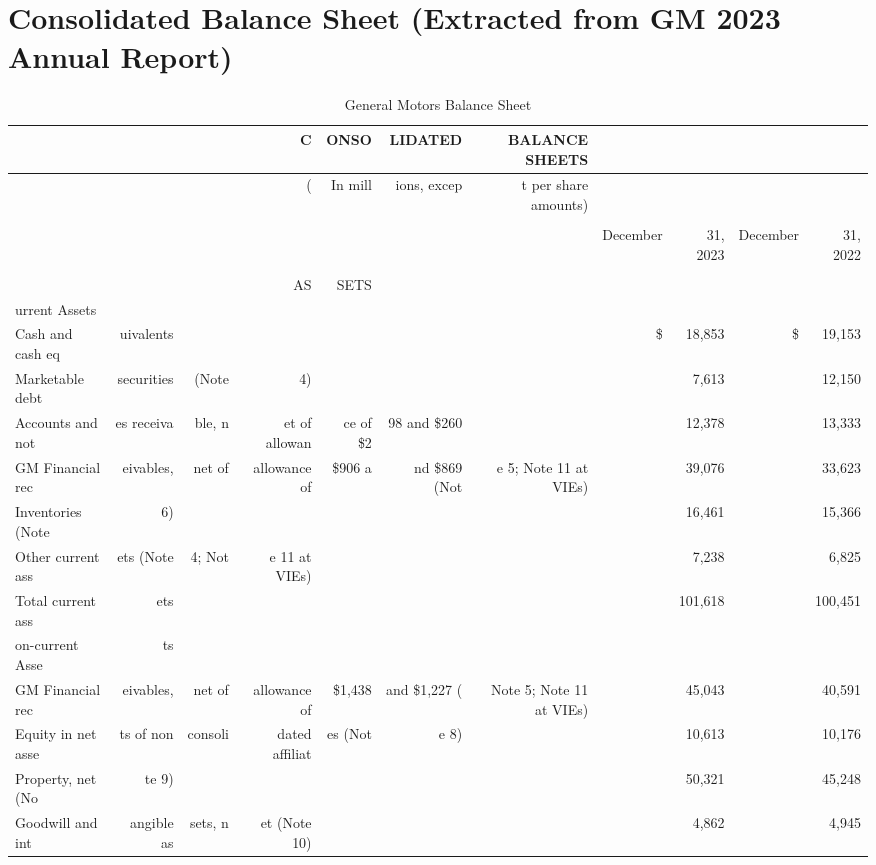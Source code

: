 \documentclass{article}
\begin{document}
\section*{Consolidated Balance Sheet (Extracted from GM 2023 Annual Report)}
\begin{table}[ht]
\centering
\caption{General Motors Balance Sheet}
\begin{tabular}{lrrrrrrrrrr}
\toprule
 &  &  & C & ONSO & LIDATED & BALANCE SHEETS &  &  &  &  \\
\midrule
 &  &  & ( & In mill & ions, excep & t per share amounts) &  &  &  &  \\
 &  &  &  &  &  &  &  &  &  &  \\
 &  &  &  &  &  &  & December & 31, 2023 & December & 31, 2022 \\
 &  &  &  &  &  &  &  &  &  &  \\
 &  &  & AS & SETS &  &  &  &  &  &  \\
urrent Assets &  &  &  &  &  &  &  &  &  &  \\
Cash and cash eq & uivalents &  &  &  &  &  & \$ & 18,853 & \$ & 19,153 \\
Marketable debt & securities & (Note & 4) &  &  &  &  & 7,613 &  & 12,150 \\
Accounts and not & es receiva & ble, n & et of allowan & ce of \$2 & 98 and \$260 &  &  & 12,378 &  & 13,333 \\
GM Financial rec & eivables, & net of & allowance of & \$906 a & nd \$869 (Not & e 5; Note 11 at VIEs) &  & 39,076 &  & 33,623 \\
Inventories (Note & 6) &  &  &  &  &  &  & 16,461 &  & 15,366 \\
Other current ass & ets (Note & 4; Not & e 11 at VIEs) &  &  &  &  & 7,238 &  & 6,825 \\
Total current ass & ets &  &  &  &  &  &  & 101,618 &  & 100,451 \\
on-current Asse & ts &  &  &  &  &  &  &  &  &  \\
GM Financial rec & eivables, & net of & allowance of & \$1,438 & and \$1,227 ( & Note 5; Note 11 at VIEs) &  & 45,043 &  & 40,591 \\
Equity in net asse & ts of non & consoli & dated affiliat & es (Not & e 8) &  &  & 10,613 &  & 10,176 \\
Property, net (No & te 9) &  &  &  &  &  &  & 50,321 &  & 45,248 \\
Goodwill and int & angible as & sets, n & et (Note 10) &  &  &  &  & 4,862 &  & 4,945 \\

\end{tabular}
\end{table}
\end{document}
